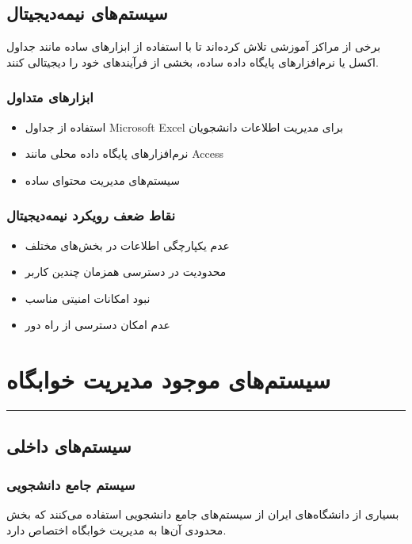 \documentclass[12pt,a4paper]{report}
\begin{document}
	\subsection{سیستم‌های نیمه‌دیجیتال}
	
	برخی از مراکز آموزشی تلاش کرده‌اند تا با استفاده از ابزارهای ساده مانند جداول اکسل یا نرم‌افزارهای پایگاه داده ساده، بخشی از فرآیندهای خود را دیجیتالی کنند.
	
	\subsubsection*{ابزارهای متداول}
	\begin{itemize}
		\item استفاده از جداول Microsoft Excel برای مدیریت اطلاعات دانشجویان
		\item نرم‌افزارهای پایگاه داده محلی مانند Access
		\item سیستم‌های مدیریت محتوای ساده
	\end{itemize}
	
	\subsubsection*{نقاط ضعف رویکرد نیمه‌دیجیتال}
	\begin{itemize}
		\item عدم یکپارچگی اطلاعات در بخش‌های مختلف
		\item محدودیت در دسترسی همزمان چندین کاربر
		\item نبود امکانات امنیتی مناسب
		\item عدم امکان دسترسی از راه دور
	\end{itemize}
	
	
	\newpage
	\section{سیستم‌های موجود مدیریت خوابگاه}
	
	\noindent\rule{\textwidth}{0.4pt}
	
	\subsection{سیستم‌های داخلی}
	
	\subsubsection{سیستم جامع دانشجویی}
	
	بسیاری از دانشگاه‌های ایران از سیستم‌های جامع دانشجویی استفاده می‌کنند که بخش محدودی آن‌ها به مدیریت خوابگاه اختصاص دارد.
	
\end{document}
